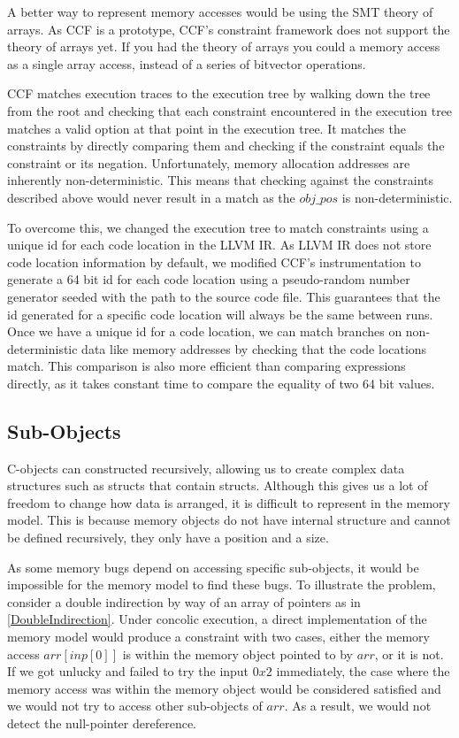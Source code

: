 \documentclass[12pt,twoside]{report}
\begin{document}
A better way to represent memory accesses would be using the SMT theory of arrays. As CCF is a prototype, CCF's constraint framework does not support the theory of arrays yet. If you had the theory of arrays you could a memory access as a single array access, instead of a series of bitvector operations. 

CCF matches execution traces to the execution tree by walking down the tree from the root and checking that each constraint encountered in the execution tree matches a valid option at that point in the execution tree. It matches the constraints by directly comparing them and checking if the constraint equals the constraint or its negation. Unfortunately, memory allocation addresses are inherently non-deterministic. This means that checking against the constraints described above would never result in a match as the $obj\_pos$ is non-deterministic.

To overcome this, we changed the execution tree to match constraints using a unique id for each code location in the LLVM IR. As LLVM IR does not store code location information by default, we modified CCF's instrumentation to generate a 64 bit id for each code location using a pseudo-random number generator seeded with the path to the source code file. This guarantees that the id generated for a specific code location will always be the same between runs. Once we have a unique id for a code location, we can match branches on non-deterministic data like memory addresses by checking that the code locations match. This comparison is also more efficient than comparing expressions directly, as it takes constant time to compare the equality of two 64 bit values.

\subsection{Sub-Objects}
C-objects can constructed recursively, allowing us to create complex data structures such as structs that contain structs. Although this gives us a lot of freedom to change how data is arranged, it is difficult to represent in the memory model. This is because memory objects do not have internal structure and cannot be defined recursively, they only have a position and a size.

As some memory bugs depend on accessing specific sub-objects, it would be impossible for the memory model to find these bugs. To illustrate the problem, consider a double indirection by way of an array of pointers as in \ref{DoubleIndirection}. Under concolic execution, a direct implementation of the memory model would produce a constraint with two cases, either the memory access $arr[inp[0]]$ is within the memory object pointed to by $arr$, or it is not. If we got unlucky and failed to try the input $0x2$ immediately, the case where the memory access was within the memory object would be considered satisfied and we would not try to access other sub-objects of $arr$. As a result, we would not detect the null-pointer dereference.
\end{document}
